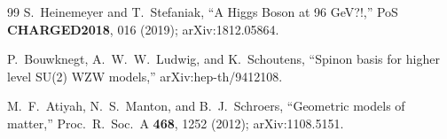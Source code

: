 \documentclass[aps,prl,twocolumn,superscriptaddress,floatfix,nofootinbib,reprint]{revtex4-2}
\begin{document}
\begin{thebibliography}{99}
S.~Heinemeyer and T.~Stefaniak, ``A Higgs Boson at 96 GeV?!,'' PoS
\textbf{CHARGED2018}, 016 (2019); arXiv:1812.05864.

P.~Bouwknegt, A.~W.~W.~Ludwig, and K.~Schoutens, ``Spinon basis for
higher level SU(2) WZW models,'' arXiv:hep-th/9412108.

M.~F.~Atiyah, N.~S.~Manton, and B.~J.~Schroers, ``Geometric models of
matter,'' Proc.\ R.\ Soc.\ A \textbf{468}, 1252 (2012); arXiv:1108.5151.

\end{thebibliography}
\end{document}
